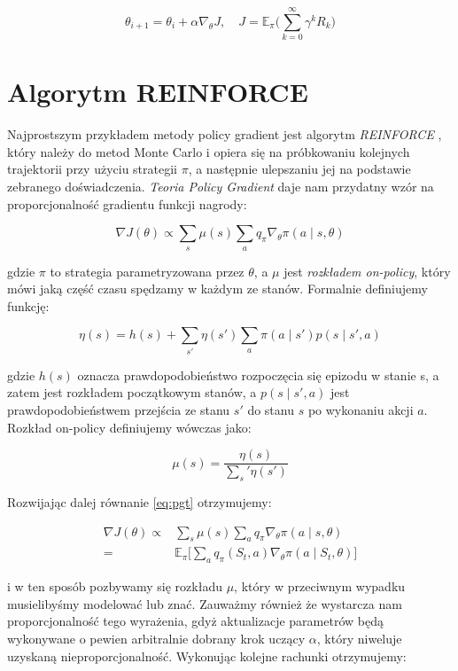 \documentclass[licencjacka]{pracamgr}
\begin{document}
$$ \theta_{i+1} = \theta_i + \alpha \nabla_{\theta}J , \quad
J = \mathbb{E}_{\pi} \Big( \sum_{k = 0}^{\infty} \gamma^k R_k \Big)
$$

\section{Algorytm REINFORCE}

Najprostszym przykładem metody policy gradient jest algorytm \emph{REINFORCE} \cite{reinforce}, który należy do metod Monte Carlo i opiera się na próbkowaniu kolejnych trajektorii przy użyciu strategii $\pi$, a następnie ulepszaniu jej na podstawie zebranego doświadczenia. \emph{Teoria Policy Gradient} daje nam przydatny wzór na proporcjonalność gradientu funkcji nagrody:

\begin{equation}\label{eq:pgt}
\nabla J(\theta) \propto \sum_s \mu(s) \sum_a q_{\pi} \nabla_{\theta} \pi(a \mid s, \theta)
\end{equation}

gdzie $\pi$ to strategia parametryzowana przez $\theta$, a $\mu$ jest \emph{rozkładem on-policy}, który mówi jaką część czasu spędzamy w każdym ze stanów. Formalnie definiujemy funkcję:

$$ \eta(s) = h(s) + \sum_{s'} \eta(s') \sum_{a} \pi(a \mid s') p(s \mid s', a) $$

gdzie $ h(s) $ oznacza prawdopodobieństwo rozpoczęcia się epizodu w stanie s, a zatem jest rozkładem początkowym stanów, a $p(s \mid s', a) $ jest prawdopodobieństwem przejścia ze stanu $s'$ do stanu $s$ po wykonaniu akcji $a$. Rozkład on-policy definiujemy wówczas jako:

$$ \mu (s) = \frac{\eta(s)}{\sum_s' \eta(s')} $$

Rozwijając dalej równanie \eqref{eq:pgt} otrzymujemy:

\begin{align*}
\nabla J(\theta) \propto & \sum_s \mu(s) \sum_a q_{\pi} \nabla_{\theta} \pi(a \mid s, \theta) \\
= & \mathbb{E}_\pi \Bigg[ \sum_{a} q_\pi (S_t, a) \nabla_\theta \pi(a \mid S_t, \theta) \Bigg]
\end{align*}

i w ten sposób pozbywamy się rozkładu $\mu$, który w przeciwnym wypadku musielibyśmy modelować lub znać. Zauważmy również że wystarcza nam proporcjonalność tego wyrażenia, gdyż aktualizacje parametrów będą wykonywane o pewien arbitralnie dobrany krok uczący $\alpha$, który niweluje uzyskaną nieproporcjonalność. Wykonując kolejne rachunki otrzymujemy: 
\end{document}
